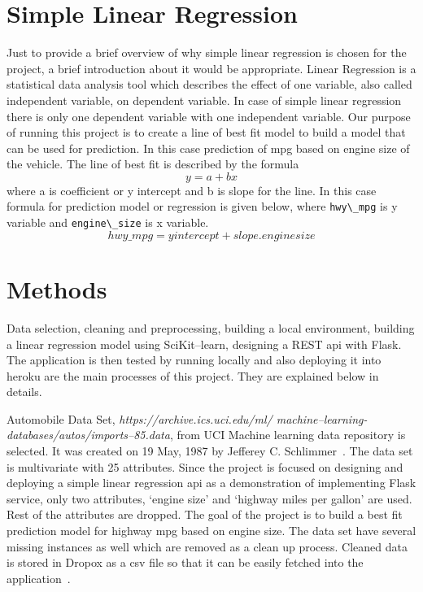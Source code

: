 \section{Simple Linear Regression}

  Just to provide a brief overview of why simple linear regression is
  chosen for the project, a brief introduction about it would be
  appropriate. Linear Regression is a statistical data analysis tool
  which describes the effect of one variable, also called independent
  variable, on dependent variable. In case of simple linear regression
  there is only one dependent variable with one independent variable.
  Our purpose of running this project
  is to create a line of best fit model to build a model that can be used
  for prediction. In this case prediction of mpg based on engine size
  of the vehicle. The line of best fit is described by the
  formula \[y = a + bx\] where a is coefficient or y intercept and b is
  slope for the line. In this case formula for prediction model or
  regression is given below, where \verb|hwy\_mpg| is y variable and
  \verb|engine\_size| is x variable.
  \[hwy\_mpg = yintercept + slope.enginesize\] 

\section{Methods}
 
  Data selection, cleaning and preprocessing, building a local
  environment, building a linear regression model using SciKit--learn,
  designing a REST api with Flask. The application is then tested by running 
  locally and also deploying it into heroku are the main
  processes of this project. They are explained below in details. 

   Automobile Data Set, \textit{https://archive.ics.uci.edu/ml/
   machine--learning-databases/autos/imports--85.data}, from UCI
   Machine learning data repository is selected. It was created
   on 19 May, 1987 by Jefferey C. Schlimmer~\cite{hid-sp18-415-uci-com}. The
   data set is multivariate with 25 attributes. Since the project
   is focused on designing and deploying a simple linear
   regression api as a demonstration of implementing Flask service,
   only two attributes, `engine size' and `highway miles per gallon'
   are used. Rest of the attributes are dropped. The goal of the
   project is to build a best fit prediction model for highway mpg
   based on engine size. The data set have several missing instances
   as well which are removed as a clean up process. Cleaned data is stored in
   Dropox as a csv   file so that it can be easily fetched into the
   application~\cite{hid-sp18-415-data}.
  
